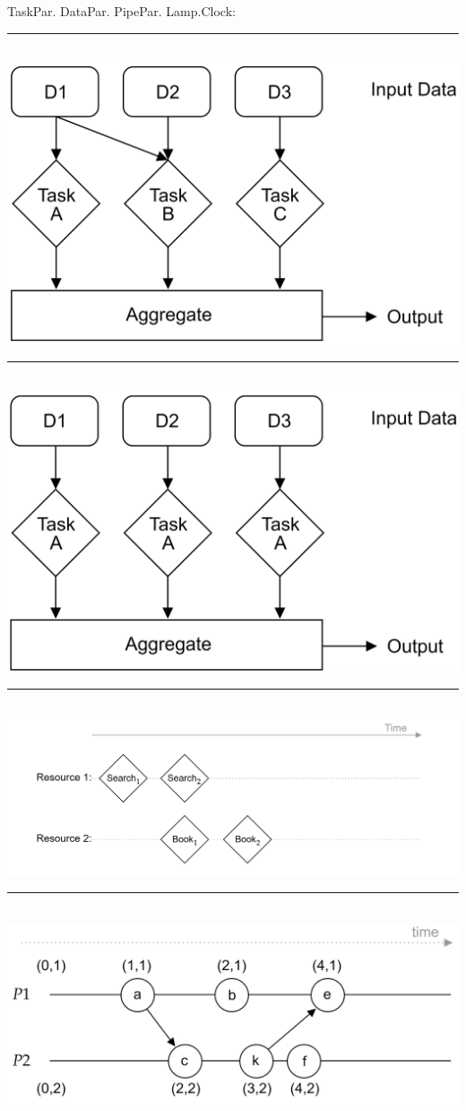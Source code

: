 \begin{multicols}{2}
\noindent
TaskPar. DataPar. PipePar. Lamp.Clock:
\noindent
\rule{\linewidth}{0.4pt}\\
\includegraphics[width=.7\linewidth]{./Sections/rpc_2/tpar.png}\\
\noindent
\rule{\linewidth}{0.4pt}\\
\includegraphics[width=.7\linewidth]{./Sections/rpc_2/dpar.png}\\
\noindent
\rule{\linewidth}{0.4pt}\\
\includegraphics[width=\linewidth]{./Sections/rpc_2/ppar_2.png}
\noindent
\rule{\linewidth}{0.4pt}\\
\includegraphics[width=\linewidth]{./Sections/time/lamport.png}
\end{multicols}


